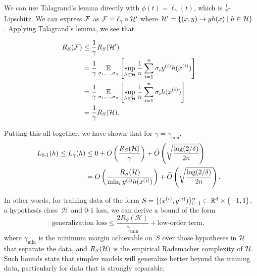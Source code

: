 We can use Talagrand's lemma directly with $\phi(t) = \ell_\gamma(t)$, which is $\frac{1}{\gamma}$-Lipschitz. We can express $\cF$ as $\cF=\ell_\gamma\circ\cH'$ where $\cH' = \{(x,y)\to yh(x)\mid h\in\cH\}$. Applying Talagrand's lemma, we see that

\begin{align}
R_S(\cF) &\leq \frac{1}{\gamma}R_S(\cH') \\
&= \frac{1}{\gamma}\Exp_{\sigma_1,\dots, \sigma_n} \l[ \sup_{h\in \cH} \frac{1}{n} \sum^n_{i=1} \sigma_i y^{(i)}h(x^{(i)}) \r] \\
&= \frac{1}{\gamma}\Exp_{\sigma_1,\dots, \sigma_n} \l[ \sup_{h\in \cH} \frac{1}{n} \sum^n_{i=1} \sigma_i h(x^{(i)})  \r] \\
&= \frac{1}{\gamma}R_S(\cH).
\end{align}

Putting this all together, we have shown that for $\gamma = \gamma_{\min}$,
\begin{align}
\Err(h) \leq L_\gamma(h) &\leq 0 + O \left( \frac{R_S(\cH)}{\gamma} \right) + \tilO \left( \sqrt{\frac{\log (2 / \delta)}{2n}} \right) \\
&= O \left( \frac{R_S(\cH)}{\min_i y\sp{i} h(x\sp{i}) } \right) + \tilO \left( \sqrt{\frac{\log (2 / \delta)}{2n}} \right).
\end{align}

In other words, for training data of the form $S = \{(x\sp{i},y\sp{i})\}_{i=1}^n \subset \mathbb{R}^d \times \{-1,1\}$, a hypothesis class~$\mathcal{H}$ and 0-1 loss, we can derive a bound of the form
\begin{equation}\label{lec7:eqn:generalization_loss}
    \text{generalization loss} \leq \frac{2R_S(\mathcal{H})}{\gamma_{\mathrm{min}}} + \text{low-order term},
\end{equation}
where $\gamma_\mathrm{min}$ is the minimum margin achievable on~$S$ over those hypotheses in $\cH$ that separate the data, and $R_S(\cH)$ is the empirical Rademacher complexity of $\cH$. Such bounds state that simpler models will generalize better beyond the training data, particularly for data that is strongly separable.

